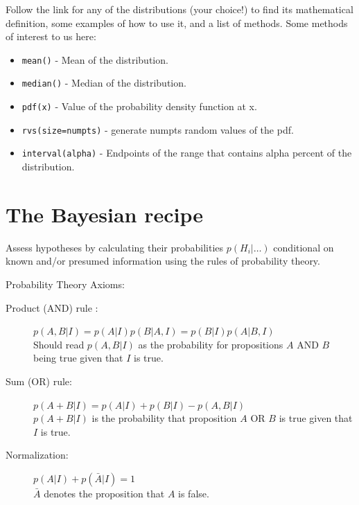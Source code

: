\documentclass[%
oneside,                 %
final,                   %
10pt]{article}
\newenvironment{block_mdfboxadmon}[1][]{
\begin{block_mdfboxmdframed}[frametitle=#1]
}
{
\end{block_mdfboxmdframed}
}
\begin{document}
Follow the link for any of the distributions (your choice!) to find its mathematical definition, some examples of how to use it, and a list of methods. Some methods of interest to us here:

\begin{itemize}
 \item \texttt{mean()} - Mean of the distribution.

 \item \texttt{median()} - Median of the distribution.

 \item \texttt{pdf(x)} - Value of the probability density function at x.

 \item \texttt{rvs(size=numpts)} - generate numpts random values of the pdf.

 \item \texttt{interval(alpha)} - Endpoints of the range that contains alpha percent of the distribution.
\end{itemize}

\noindent
\section{The Bayesian recipe}

\begin{block_mdfboxadmon}[]
Assess hypotheses by calculating their probabilities $p(H_i | \ldots)$ conditional on known and/or presumed information using the rules of probability theory.
\end{block_mdfboxadmon} %




\begin{block_mdfboxadmon}[]
Probability Theory Axioms:
\begin{description}
\item[Product (AND) rule :] 
  $p(A, B | I) = p(A|I) p(B|A, I) = p(B|I)p(A|B,I)$\\
  Should read $p(A,B|I)$ as the probability for propositions $A$ AND $B$ being true given that $I$ is true.

\item[Sum (OR) rule:] 
  $p(A + B | I) = p(A | I) + p(B | I) - p(A, B | I)$\\
  $p(A+B|I)$ is the probability that proposition $A$ OR $B$ is true given that $I$ is true.

\item[Normalization:] 
  $p(A|I) + p(\bar{A}|I) = 1$\\
  $\bar{A}$ denotes the proposition that $A$ is false.
\end{description}

\noindent
\end{block_mdfboxadmon} %
\end{document}
